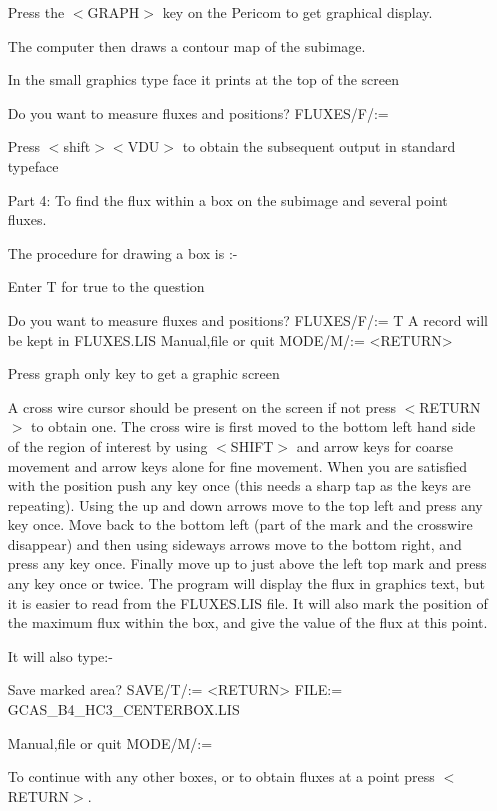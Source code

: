 \documentclass[nolof,noabs,11pt]{starlink}
\begin{document}
\begin{itemize}
Press the $<$GRAPH$>$ key on the Pericom to get graphical display.

The computer then draws a contour map of the subimage.

In the small graphics type face it prints at the top of the screen
\begin{terminalv}
Do you want to measure fluxes and positions?
FLUXES/F/:=
\end{terminalv}
Press $<$shift$>$$<$VDU$>$ to obtain the subsequent output in standard typeface

\pagebreak
\item [Part 4:] To find the flux within a box on the subimage and several point
fluxes.


The procedure for drawing a box is :-

Enter T for true to the question

\begin{terminalv}
Do you want to measure fluxes and positions?
FLUXES/F/:= T
A record will be kept in FLUXES.LIS
Manual,file or quit
MODE/M/:= <RETURN>
\end{terminalv}

Press graph only key to get a graphic screen

A cross wire cursor should be present on the screen if not press $<$RETURN$>$ to
obtain one. The cross wire is first moved to the bottom left hand side of the
region of interest by using $<$SHIFT$>$ and arrow keys for coarse movement and
arrow keys alone for fine movement. When you are satisfied with the position
push any key once (this needs a sharp tap as the keys are repeating). Using the
up and down arrows move to the top left and press any key once. Move back to
the bottom left (part of the mark and the crosswire disappear) and then using
sideways arrows move to the bottom right, and press any key once. Finally move
up to just above the left top mark and press any key once or twice. The program
will display the flux in graphics text, but it is easier to read from the
FLUXES.LIS file. It will also mark the position of the maximum flux within the
box, and give the value of the flux at this point.

It will also type:-
\begin{terminalv}
Save marked area?
SAVE/T/:= <RETURN>
FILE:= GCAS_B4_HC3_CENTERBOX.LIS

Manual,file or quit
MODE/M/:=
\end{terminalv}

To continue with any other boxes, or to obtain fluxes at a point press
$<$RETURN$>$.


\end{itemize}
\end{document}
